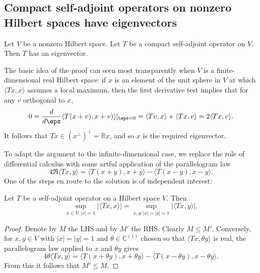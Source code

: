\documentclass[reqno]{amsart} 
\begin{document}
\subsection{Compact self-adjoint operators on nonzero Hilbert spaces have eigenvectors}
\label{sec:org816b98f}
\begin{theorem}\label{thm:compact-self-adj-has-eigencetor}
  Let $V$ be a nonzero Hilbert space.
  Let $T$ be a compact self-adjoint operator on $V$.
  Then $T$ has an eigenvector.
\end{theorem}
The basic idea of the proof can seen most transparently when $V$ is a
finite-dimensional real Hilbert space:
if $x$ is an element of the unit sphere in $V$
at which $\langle T x, x \rangle$ assumes a local maximum,
then the first derivative test implies that for any $v$ orthogonal to $x$,
\begin{equation*}
0 = \frac{d}{d \eps } \langle T (x + v), x + v)
\rangle|_{\eps=0} = \langle T v, x \rangle + \langle T x, v
\rangle = 2 \langle T x, v \rangle.
\end{equation*}
It follows that $T x \in (x^\perp)^\perp = \mathbb{R} x$, and
so $x$ is the required eigenvector.  

To adapt the argument to the infinite-dimensional
case, we replace the role of differential calculus
with some artful application of the parallelogram law
\begin{equation*}
4 \Re  \langle T x, y \rangle
= \langle T(x+ y), x + y  \rangle
- \langle T(x- y), x- y \rangle.
\end{equation*}
One of the steps en route to the solution
is of independent interest:
\begin{lemma}
  Let $T$ be a self-adjoint operator on a Hilbert space $V$.
  Then
  \begin{equation*}
  \sup_{x \in V : |x| = 1} |\langle T x, x \rangle|
  =
  \sup_{x,y: |x|=|y| = 1} |\langle T x, y \rangle|.
  \end{equation*}
\end{lemma}
\begin{proof}
  Denote by $M$ the LHS and by $M'$ the RHS.
  Clearly $M \leq M'$.
  Conversely,
  for $x,y \in V$ with $|x| = |y| = 1$
  and $\theta \in \mathbb{C}^{(1)}$
  chosen so that
  $\langle T x, \theta y \rangle$ is real,
  the parallelogram law applied to $x$ and $\theta y$
  gives
  \begin{equation*}
  4 \theta  \langle T x, y \rangle
  = \langle T(x+ \theta  y), x + \theta y  \rangle
  - \langle T(x-\theta y), x-\theta y \rangle.
  \end{equation*}
  From this it follows that $M' \leq M$.
\end{proof}
\end{document}
